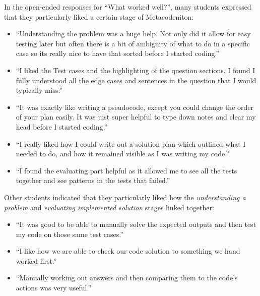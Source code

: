 \documentclass[sigconf,anonymous]{acmart}
\begin{document}
In the open-ended responses for ``What worked well?'', many students expressed that they particularly liked a certain stage of Metacodeniton:
\begin{itemize}
    \item ``Understanding the problem was a huge help. Not only did it allow for easy testing later but often there is a bit of ambiguity of what to do in a specific case so its really nice to have that sorted before I started coding.''
    \item ``I liked the Test cases and the highlighting of the question sections. I found I fully understood all the edge cases and sentences in the question that I would typically miss.''
     \item ``It was exactly like writing a pseudocode, except you could change the order of your plan easily. It was just super helpful to type down notes and clear my head before I started coding.''
    \item ``I really liked how I could write out a solution plan which outlined what I needed to do, and how it remained visible as I was writing my code.''
    \item ``I found the evaluating part helpful as it allowed me to see all the tests together and see patterns in the tests that failed.''
\end{itemize}

Other students indicated that they particularly liked how the \emph{understanding a problem} and \emph{evaluating implemented solution} stages linked together:
\begin{itemize}
    \item ``It was good to be able to manually solve the expected outputs and then test my code on those same test cases.''
    \item ``I like how we are able to check our code solution to something we hand worked first.''
    \item ``Manually working out answers and then comparing them to the code's actions was very useful.''
\end{itemize}
\end{document}
